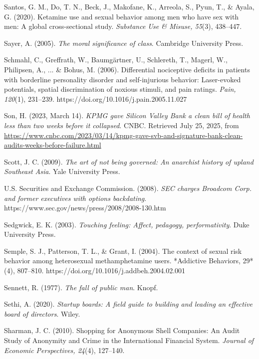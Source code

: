 \begin{thebibliography}{}

    Santos, G. M., Do, T. N., Beck, J., Makofane, K., Arreola, S., Pyun, T., \& Ayala, G. (2020). Ketamine use and sexual behavior among men who have sex with men: A global cross-sectional study. \textit{Substance Use \& Misuse, 55}(3), 438–447.

    Sayer, A. (2005). \textit{The moral significance of class}. Cambridge University Press.

    Schmahl, C., Greffrath, W., Baumgärtner, U., Schlereth, T., Magerl, W., Philipsen, A., ... \& Bohus, M. (2006). Differential nociceptive deficits in patients with borderline personality disorder and self-injurious behavior: Laser-evoked potentials, spatial discrimination of noxious stimuli, and pain ratings. \textit{Pain, 120}(1), 231–239. https://doi.org/10.1016/j.pain.2005.11.027

    Son, H. (2023, March 14). \textit{KPMG gave Silicon Valley Bank a clean bill of health less than two weeks before it collapsed}. CNBC. Retrieved July 25, 2025, from \url{https://www.cnbc.com/2023/03/14/kpmg-gave-svb-and-signature-bank-clean-audits-weeks-before-failure.html}

    Scott, J. C. (2009). \textit{The art of not being governed: An anarchist history of upland Southeast Asia}. Yale University Press.
    
    U.S. Securities and Exchange Commission. (2008). \textit{SEC charges Broadcom Corp. and former executives with options backdating}. https://www.sec.gov/news/press/2008/2008-130.htm

    Sedgwick, E. K. (2003). \textit{Touching feeling: Affect, pedagogy, performativity}. Duke University Press.

    Semple, S. J., Patterson, T. L., \& Grant, I. (2004). The context of sexual risk behavior among heterosexual methamphetamine users. *Addictive Behaviors, 29*(4), 807–810. https://doi.org/10.1016/j.addbeh.2004.02.001

    Sennett, R. (1977). \textit{The fall of public man}. Knopf.

    Sethi, A. (2020). \textit{Startup boards: A field guide to building and leading an effective board of directors}. Wiley.


    Sharman, J. C. (2010). Shopping for Anonymous Shell Companies: An Audit Study of Anonymity and Crime in the International Financial System. \textit{Journal of Economic Perspectives, 24}(4), 127–140.


\end{thebibliography}
